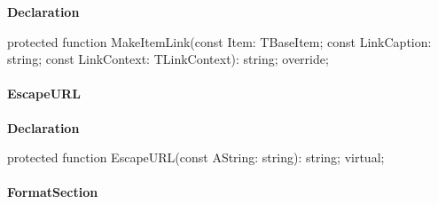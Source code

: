 \documentclass{report}
\newif\ifpdf
\begin{document}
\label{PasDoc_GenHtml.TGenericHTMLDocGenerator-MakeItemLink}
\begin{list}{}{
\setlength{\itemindent}{0cm}
\setlength{\listparindent}{0cm}
\setlength{\leftmargin}{\evensidemargin}
\addtolength{\leftmargin}{\tmplength}
\settowidth{\labelsep}{X}
\addtolength{\leftmargin}{\labelsep}
\setlength{\labelwidth}{\tmplength}
}
\item[\textbf{Declaration}\hfill]
\ifpdf
\begin{flushleft}
\fi
\begin{ttfamily}
protected function MakeItemLink(const Item: TBaseItem; const LinkCaption: string; const LinkContext: TLinkContext): string; override;\end{ttfamily}

\ifpdf
\end{flushleft}
\fi

\end{list}
\paragraph*{EscapeURL}\hspace*{\fill}

\label{PasDoc_GenHtml.TGenericHTMLDocGenerator-EscapeURL}
\begin{list}{}{
\setlength{\itemindent}{0cm}
\setlength{\listparindent}{0cm}
\setlength{\leftmargin}{\evensidemargin}
\addtolength{\leftmargin}{\tmplength}
\settowidth{\labelsep}{X}
\addtolength{\leftmargin}{\labelsep}
\setlength{\labelwidth}{\tmplength}
}
\item[\textbf{Declaration}\hfill]
\ifpdf
\begin{flushleft}
\fi
\begin{ttfamily}
protected function EscapeURL(const AString: string): string; virtual;\end{ttfamily}

\ifpdf
\end{flushleft}
\fi

\end{list}
\paragraph*{FormatSection}\hspace*{\fill}
\end{document}
